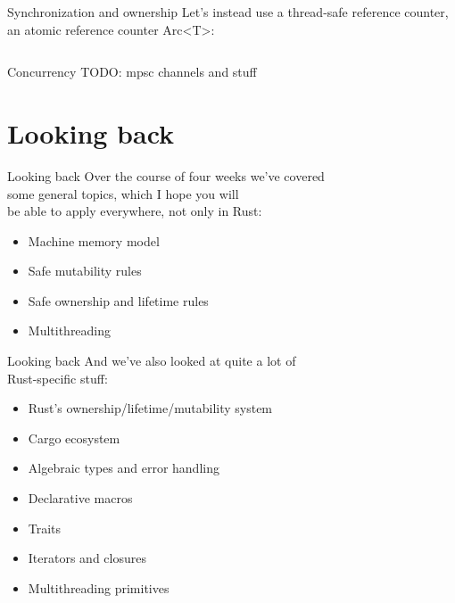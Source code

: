 \documentclass[usenames,dvipsnames,10pt,aspectratio=169]{beamer}
\begin{document}
\begin{frame}{Synchronization and ownership}
	\normalsize
	Let's instead use a thread-safe reference counter,\\
	an atomic reference counter \textcolor{ucuyellow}{Arc<T>}:
	\inputminted[fontsize=\scriptsize]{rust}{code/mutex4.rs}
	\vspace{0.4cm}
\end{frame}

\begin{frame}{Concurrency}
	\large
	\textcolor{ucured}{TODO: mpsc channels and stuff}
\end{frame}


\section{Looking back}

\begin{frame}{Looking back}
	\large
	Over the course of four weeks we've covered\\
	some general topics, which I hope you will\\
	be able to apply everywhere, not only in Rust:\\
	\vspace{0.1cm}
\begin{itemize}[label=$\bullet$]
	\item Machine memory model
	\item Safe mutability rules
	\item Safe ownership and lifetime rules
	\item Multithreading
\end{itemize}
	
\end{frame}

\begin{frame}{Looking back}
	\large
	And we've also looked at quite a lot of\\
	Rust-specific stuff:
	\vspace{0.1cm}
\begin{itemize}[label=$\bullet$]
	\item Rust's ownership/lifetime/mutability system
	\item Cargo ecosystem
	\item Algebraic types and error handling
	\item Declarative macros
	\item Traits
	\item Iterators and closures
	\item Multithreading primitives
\end{itemize}
\end{frame}
\end{document}
